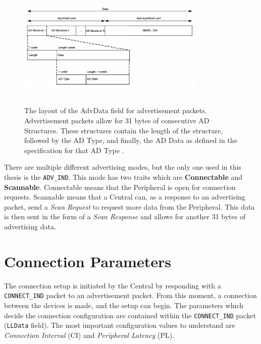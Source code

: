 \begin{figure}[]
    \centering
    \includegraphics[width=0.8\textwidth,height=6cm,keepaspectratio=true]{images/advertising_data}
    \caption{
        The layout of the AdvData field for advertisement packets. Advertisement packets allow for 31 bytes of consecutive AD Structures. These structures contain the length of the structure, followed by the AD Type, and finally, the AD Data as defined in the specification for that AD Type \cite{bluetooth_spec}.
    }
    \label{fig:advdata_layout}
\end{figure}

There are multiple different advertising modes, but the only one used in this thesis is the \texttt{ADV\_IND}. This mode has two traits which are \textbf{Connectable} and \textbf{Scannable}. Connectable means that the Peripheral is open for connection requests. Scannable means that a Central can, as a response to an advertising packet, send a \textit{Scan Request} to request more data from the Peripheral. This data is then sent in the form of a \textit{Scan Response} and allows for another 31 bytes of advertising data.

\section{Connection Parameters}
The connection setup is initiated by the Central by responding with a \texttt{CONNECT\_IND} packet to an advertisement packet. From this moment, a connection between the devices is made, and the setup can begin. The parameters which decide the connection configuration are contained within the \texttt{CONNECT\_IND} packet (\texttt{LLData} field). The most important configuration values to understand are \textit{Connection Interval} (CI) and \textit{Peripheral Latency} (PL). 


